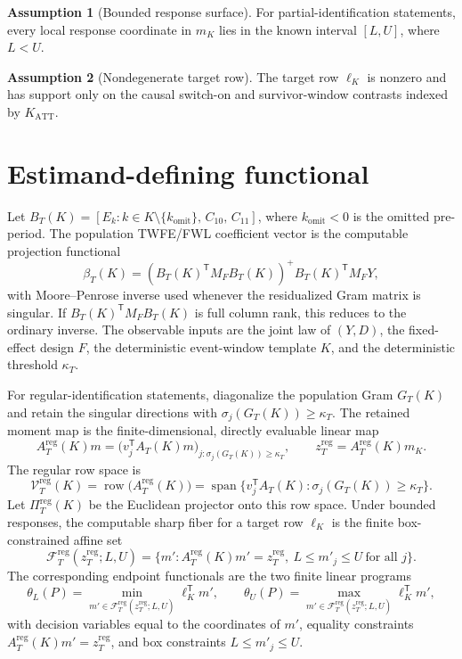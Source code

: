 \documentclass[11pt]{article}
\newcommand{\transpose}{\mathsf{T}}
\theoremstyle{definition}
\newtheorem{assumption}{Assumption}
\theoremstyle{plain}
\theoremstyle{remark}
\begin{document}
\begin{assumption}[Bounded response surface]\label{ass:bounded-response}
For partial-identification statements, every local response coordinate in \(m_K\) lies in the known interval \([L,U]\), where \(L<U\).
\end{assumption}

\begin{assumption}[Nondegenerate target row]\label{ass:nondegenerate-target}
The target row \(\ell_K\) is nonzero and has support only on the causal switch-on and survivor-window contrasts indexed by \(K_{\mathrm{ATT}}\).
\end{assumption}

\section{Estimand-defining functional}
Let \(B_T(K)=[E_k:k\in K\setminus\{k_{\mathrm{omit}}\},\, C_{10},\, C_{11}]\), where \(k_{\mathrm{omit}}<0\) is the omitted pre-period.
The population TWFE/FWL coefficient vector is the computable projection functional
\[
\beta_T(K)
=\left(B_T(K)^\transpose M_F B_T(K)\right)^+
  B_T(K)^\transpose M_F Y,
\]
with Moore--Penrose inverse used whenever the residualized Gram matrix is singular.
If \(B_T(K)^\transpose M_F B_T(K)\) is full column rank, this reduces to the ordinary inverse.
The observable inputs are the joint law of \((Y,D)\), the fixed-effect design \(F\), the deterministic event-window template \(K\), and the deterministic threshold \(\kappa_T\).

For regular-identification statements, diagonalize the population Gram \(G_T(K)\) and retain the singular directions with \(\sigma_j(G_T(K))\ge\kappa_T\).
The retained moment map is the finite-dimensional, directly evaluable linear map
\[
A_T^{\mathrm{reg}}(K)m
=\bigl(v_j^\transpose A_T(K)m\bigr)_{j:\sigma_j(G_T(K))\ge\kappa_T},
\qquad
z_T^{\mathrm{reg}}=A_T^{\mathrm{reg}}(K)m_K.
\]
The regular row space is
\[
\mathcal V_T^{\mathrm{reg}}(K)=
\operatorname{row}\bigl(A_T^{\mathrm{reg}}(K)\bigr)
=\operatorname{span}\{v_j^\transpose A_T(K):\sigma_j(G_T(K))\ge\kappa_T\}.
\]
Let \(\Pi_T^{\mathrm{reg}}(K)\) be the Euclidean projector onto this row space.
Under bounded responses, the computable sharp fiber for a target row \(\ell_K\) is the finite box-constrained affine set
\[
\mathcal F_T^{\mathrm{reg}}(z_T^{\mathrm{reg}};L,U)
=\{m':A_T^{\mathrm{reg}}(K)m'=z_T^{\mathrm{reg}},\ L\le m'_j\le U\ \text{for all }j\}.
\]
The corresponding endpoint functionals are the two finite linear programs
\[
\theta_L(P)=\min_{m'\in\mathcal F_T^{\mathrm{reg}}(z_T^{\mathrm{reg}};L,U)}\ell_K^\transpose m',
\qquad
\theta_U(P)=\max_{m'\in\mathcal F_T^{\mathrm{reg}}(z_T^{\mathrm{reg}};L,U)}\ell_K^\transpose m',
\]
with decision variables equal to the coordinates of \(m'\), equality constraints \(A_T^{\mathrm{reg}}(K)m'=z_T^{\mathrm{reg}}\), and box constraints \(L\le m'_j\le U\).
\end{document}
